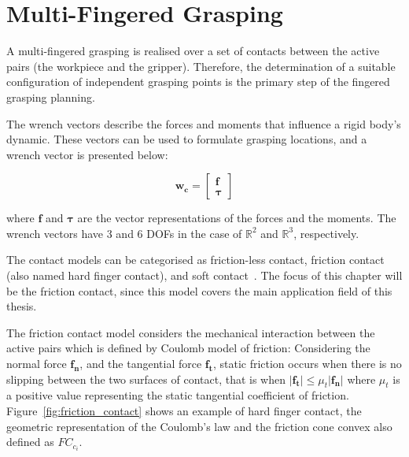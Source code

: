 \section{Multi-Fingered Grasping}
\label{sec:multifingered_grasping}

A multi-fingered grasping is realised over a set of contacts between the active pairs (the workpiece and the gripper). Therefore, the determination of a suitable configuration of independent grasping points is the primary step of the fingered grasping planning. 

The wrench vectors describe the forces and moments that influence a rigid body's dynamic. These vectors can be used to formulate grasping locations, and a wrench vector is presented below:  

\begin{equation}
\mathbf{w_{c}}=\left[\begin{array}{l}
\mathbf{f} \\
\boldsymbol{\tau}
\end{array}\right]
\end{equation}

\noindent
where $\mathbf{f}$ and $\boldsymbol{\tau}$ are the vector representations of the forces and the moments. The wrench vectors have 3 and 6 \acp{DOF} in the case of $\mathbb{R}^2$ and $\mathbb{R}^3$, respectively.

The contact models can be categorised as friction-less contact, friction contact (also named hard finger contact), and soft contact~\cite{murray1994mathematical}. The focus of this chapter will be the friction contact, since this model covers the main application field of this thesis.


The friction contact model considers the mechanical interaction between the active pairs which is defined by Coulomb model of friction: Considering the normal force $\mathbf{f_n}$, and the tangential force $\mathbf{f_t}$, static friction occurs when there is no slipping between the two surfaces of contact, that is when $\left|\mathbf{f_{t}}\right| \leq \mu_{t} |\mathbf{f_{n}}|
$ where $\mu_{t} $ is a positive value representing the static tangential coefficient of friction. Figure~\ref{fig:friction_contact} shows an example of hard finger contact, the geometric representation of the Coulomb’s law and the friction cone convex also defined as ${FC}_{c_i}$. 

